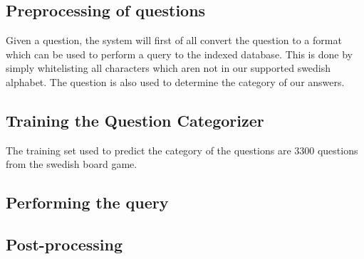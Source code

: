 \subsection{Preprocessing of questions}
Given a question, the system will first of all convert the question
to a format which can be used to perform a query to the indexed
database. This is done by simply whitelisting all characters which
aren not in our supported swedish alphabet. The question is also
used to determine the category of our answers.

\subsection{Training the Question Categorizer}
The training set used to predict the category of the questions
are 3300 questions from the swedish board game. 

\subsection{Performing the query}
\subsection{Post-processing}
